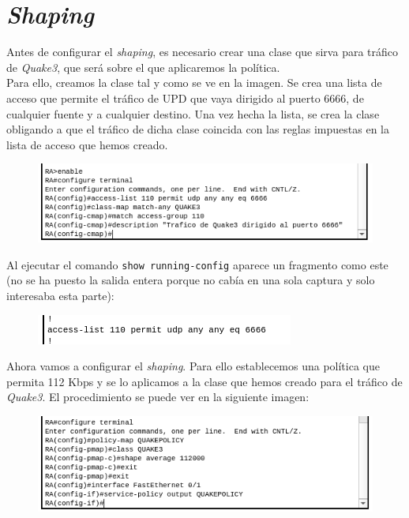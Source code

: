 \documentclass[11pt,a4paper]{article}
\begin{document}
\newpage

\section{\textit{Shaping}}

Antes de configurar el \textit{shaping}, es necesario crear una clase que sirva para tráfico de \textit{Quake3}, que será sobre el que aplicaremos la política.\\

Para ello, creamos la clase tal y como se ve en la imagen. Se crea una lista de acceso que permite el tráfico de UPD que vaya dirigido al puerto 6666, de cualquier fuente y a cualquier destino. Una vez hecha la lista, se crea la clase obligando a que el tráfico de dicha clase coincida con las reglas impuestas en la lista de acceso que hemos creado.

\begin{figure}[H]
	\centering
	\includegraphics[scale=0.7]{img/class-map.png}
\end{figure}

Al ejecutar el comando \texttt{show running-config} aparece un fragmento como este (no se ha puesto la salida entera porque no cabía en una sola captura y solo interesaba esta parte):

\begin{figure}[H]
	\centering
	\includegraphics[scale=0.7]{img/show-running-config-access-list.png}
\end{figure}

Ahora vamos a configurar el \textit{shaping}. Para ello establecemos una política que permita 112 Kbps y se lo aplicamos a la clase que hemos creado para el tráfico de \textit{Quake3}. El procedimiento se puede ver en la siguiente imagen:

\begin{figure}[H]
	\centering
	\includegraphics[scale=0.7]{img/shaping.png}
\end{figure}
\end{document}
